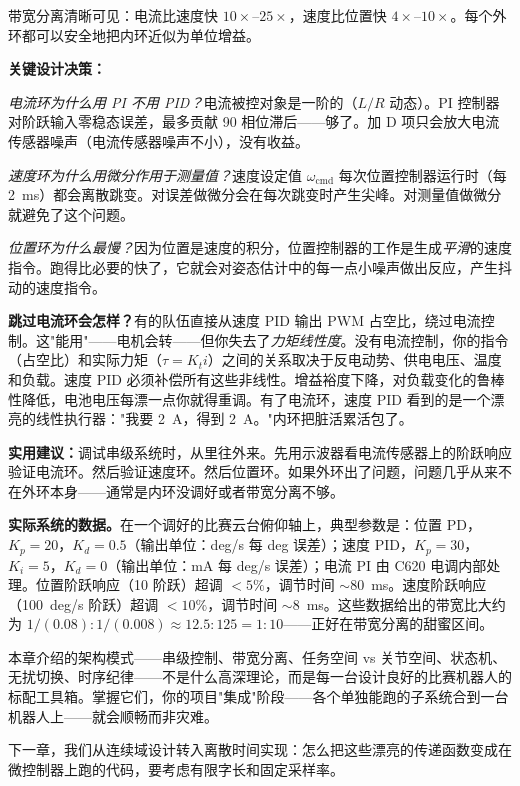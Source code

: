 \begin{mdframed}[linewidth=1pt, innertopmargin=10pt, innerbottommargin=10pt]
带宽分离清晰可见：电流比速度快 $10\times$--$25\times$，速度比位置快 $4\times$--$10\times$。每个外环都可以安全地把内环近似为单位增益。

\textbf{关键设计决策：}

\textit{电流环为什么用 PI 不用 PID？}电流被控对象是一阶的（$L/R$ 动态）。PI 控制器对阶跃输入零稳态误差，最多贡献 90\textdegree{} 相位滞后——够了。加 D 项只会放大电流传感器噪声（电流传感器噪声不小），没有收益。

\textit{速度环为什么用微分作用于测量值？}速度设定值 $\omega_{\text{cmd}}$ 每次位置控制器运行时（每 2~ms）都会离散跳变。对误差做微分会在每次跳变时产生尖峰。对测量值做微分就避免了这个问题。

\textit{位置环为什么最慢？}因为位置是速度的积分，位置控制器的工作是生成\textit{平滑}的速度指令。跑得比必要的快了，它就会对姿态估计中的每一点小噪声做出反应，产生抖动的速度指令。

\textbf{跳过电流环会怎样？}有的队伍直接从速度 PID 输出 PWM 占空比，绕过电流控制。这"能用"——电机会转——但你失去了\textit{力矩线性度}。没有电流控制，你的指令（占空比）和实际力矩（$\tau = K_t i$）之间的关系取决于反电动势、供电电压、温度和负载。速度 PID 必须补偿所有这些非线性。增益裕度下降，对负载变化的鲁棒性降低，电池电压每漂一点你就得重调。有了电流环，速度 PID 看到的是一个漂亮的线性执行器："我要 2~A，得到 2~A。"内环把脏活累活包了。

\textbf{实用建议：}调试串级系统时，从里往外来。先用示波器看电流传感器上的阶跃响应验证电流环。然后验证速度环。然后位置环。如果外环出了问题，问题几乎从来不在外环本身——通常是内环没调好或者带宽分离不够。

\textbf{实际系统的数据。}在一个调好的比赛云台俯仰轴上，典型参数是：位置 PD，$K_p = 20$，$K_d = 0.5$（输出单位：deg/s 每 deg 误差）；速度 PID，$K_p = 30$，$K_i = 5$，$K_d = 0$（输出单位：mA 每 deg/s 误差）；电流 PI 由 C620 电调内部处理。位置阶跃响应（10\textdegree{} 阶跃）超调 $<5\%$，调节时间 $\sim$80~ms。速度阶跃响应（100~deg/s 阶跃）超调 $<10\%$，调节时间 $\sim$8~ms。这些数据给出的带宽比大约为 $1/(0.08) : 1/(0.008) \approx 12.5 : 125 = 1 : 10$——正好在带宽分离的甜蜜区间。
\end{mdframed}

\vspace{0.5em}

本章介绍的架构模式——串级控制、带宽分离、任务空间 vs 关节空间、状态机、无扰切换、时序纪律——不是什么高深理论，而是每一台设计良好的比赛机器人的标配工具箱。掌握它们，你的项目"集成"阶段——各个单独能跑的子系统合到一台机器人上——就会顺畅而非灾难。

下一章，我们从连续域设计转入离散时间实现：怎么把这些漂亮的传递函数变成在微控制器上跑的代码，要考虑有限字长和固定采样率。
